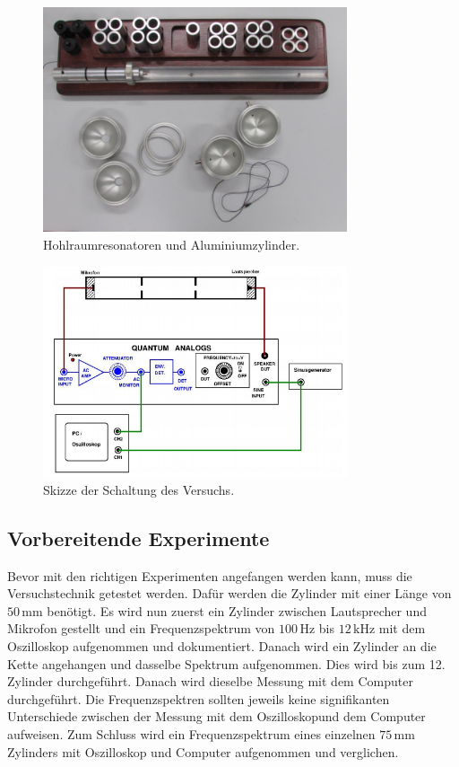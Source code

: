 \begin{figure}[H]
    \centering
    \includegraphics[width=0.8\textwidth]{Experiment.PNG}
    \caption{Hohlraumresonatoren und Aluminiumzylinder. \cite{Anleitung}}
    \label{fig:material}
\end{figure}

\begin{figure}[H]
    \centering
    \includegraphics[width=0.8\textwidth]{Schaltung.PNG}
    \caption{Skizze der Schaltung des Versuchs. \cite{Anleitung}}
    \label{fig:schaltung}
\end{figure}

\subsection{Vorbereitende Experimente}
\label{sec:vorbereitung}

Bevor mit den richtigen Experimenten angefangen werden kann, muss die Versuchstechnik getestet werden. Dafür werden die Zylinder mit einer Länge von $50 \, \mathrm{mm}$ benötigt. Es wird nun zuerst ein Zylinder zwischen Lautsprecher und Mikrofon gestellt und ein Frequenzspektrum von $100 \, \mathrm{Hz}$ bis $12 \, \mathrm{kHz}$ mit dem Oszilloskop aufgenommen und dokumentiert. Danach wird ein Zylinder an die Kette angehangen und dasselbe Spektrum aufgenommen. Dies wird bis zum 12. Zylinder durchgeführt. Danach wird dieselbe Messung mit dem Computer durchgeführt. Die Frequenzspektren sollten jeweils keine signifikanten Unterschiede zwischen der Messung mit dem Oszilloskopund dem Computer aufweisen. Zum Schluss wird ein Frequenzspektrum eines einzelnen $75 \, \mathrm{mm}$ Zylinders mit Oszilloskop und Computer aufgenommen und verglichen.

